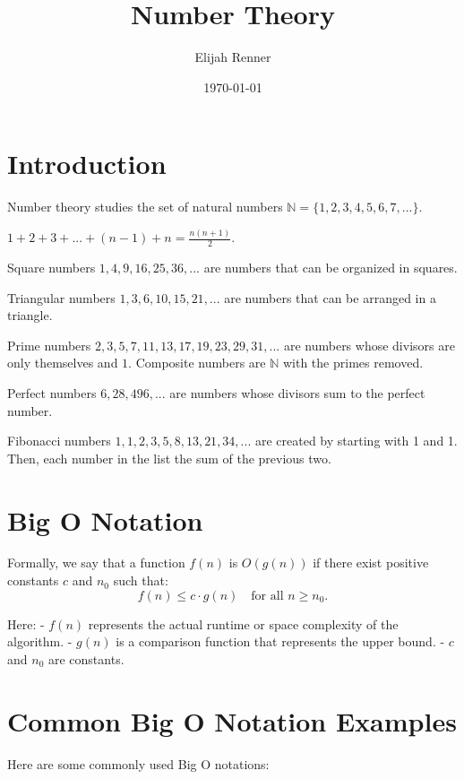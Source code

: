 \documentclass[10pt]{article}
\title{Number Theory}
\author{Elijah Renner}
\date{\today}
\theoremstyle{plain}
\theoremstyle{definition}
\theoremstyle{remark}
\begin{document}
\maketitle
\tableofcontents

\section{Introduction}

Number theory studies the set of natural numbers \(\mathbb{N}=\{1,2,3,4,5,6,7,...\}\).

\(1+2+3+...+(n-1)+n=\frac{n(n+1)}{2}\).

Square numbers \(1,4,9,16,25,36,...\) are numbers that can be organized in squares.

Triangular numbers \(1,3,6,10,15,21,...\) are numbers that can be arranged in a triangle.

Prime numbers \(2,3,5,7,11,13,17,19,23,29,31,...\) are numbers whose divisors are only themselves and \(1\). Composite numbers are \(\mathbb{N}\) with the primes removed.

Perfect numbers \(6,28,496,...\) are numbers whose divisors sum to the perfect number.

Fibonacci numbers \(1,1,2,3,5,8,13,21,34,...\) are created by starting with 1 and 1. Then, each number in the list the sum of the previous two.

\section{Big O Notation}

Formally, we say that a function \( f(n) \) is \( O(g(n)) \) if there exist positive constants \( c \) and \( n_0 \) such that:
\[
f(n) \leq c \cdot g(n) \quad \text{for all } n \geq n_0.
\]

Here:
- \( f(n) \) represents the actual runtime or space complexity of the algorithm.
- \( g(n) \) is a comparison function that represents the upper bound.
- \( c \) and \( n_0 \) are constants.

\section*{Common Big O Notation Examples}

Here are some commonly used Big O notations:
\end{document}
